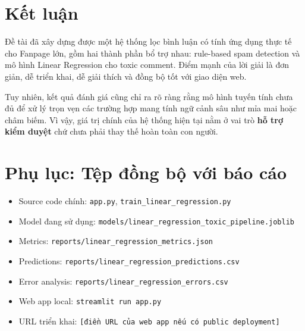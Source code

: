 \documentclass[12pt,a4paper]{article}
\begin{document}
\section{Kết luận}
Đề tài đã xây dựng được một hệ thống lọc bình luận có tính ứng dụng thực tế cho Fanpage lớn, gồm hai thành phần bổ trợ nhau: rule-based spam detection và mô hình Linear Regression cho toxic comment. Điểm mạnh của lời giải là đơn giản, dễ triển khai, dễ giải thích và đồng bộ tốt với giao diện web.

Tuy nhiên, kết quả đánh giá cũng chỉ ra rõ ràng rằng mô hình tuyến tính chưa đủ để xử lý trọn vẹn các trường hợp mang tính ngữ cảnh sâu như mỉa mai hoặc châm biếm. Vì vậy, giá trị chính của hệ thống hiện tại nằm ở vai trò \textbf{hỗ trợ kiểm duyệt} chứ chưa phải thay thế hoàn toàn con người.

\section*{Phụ lục: Tệp đồng bộ với báo cáo}
\begin{itemize}[leftmargin=1.2cm]
    \item Source code chính: \texttt{app.py}, \texttt{train\_linear\_regression.py}
    \item Model đang sử dụng: \texttt{models/linear\_regression\_toxic\_pipeline.joblib}
    \item Metrics: \texttt{reports/linear\_regression\_metrics.json}
    \item Predictions: \texttt{reports/linear\_regression\_predictions.csv}
    \item Error analysis: \texttt{reports/linear\_regression\_errors.csv}
    \item Web app local: \texttt{streamlit run app.py}
    \item URL triển khai:
    \texttt{[điền URL của web app nếu có public deployment]}
\end{itemize}
\end{document}
